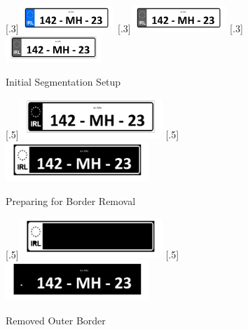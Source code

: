 \documentclass[a4paper]{article}
\begin{document}
	\begin{figure}[H]
		\centering
		[.3\linewidth]{\includegraphics[height=1cm]{Results/Q2/NumPlate5/qanumber_plate_5.jpg}}%
		[.3\linewidth]{\includegraphics[height=1cm]{Results/Q2/NumPlate5/qanumber_plate_5Grey.jpg}}%
		[.3\linewidth]{\includegraphics[height=1cm]{Results/Q2/NumPlate5/qanumber_plate_5Low.jpg}}%
		\caption{Initial Segmentation Setup}
		\label{fig:}
	\end{figure}
	\begin{figure}[H]
		\centering
		[.5\linewidth]{\includegraphics[height=1.5cm]{Results/Q2/NumPlate5/qanumber_plate_5Mid.jpg}}%
		[.5\linewidth]{\includegraphics[height=1.5cm]{Results/Q2/NumPlate5/qanumber_plate_5Not.jpg}}%
		\caption{Preparing for Border Removal}
		\label{fig:}
	\end{figure}
	\begin{figure}[H]
		\centering
		[.5\linewidth]{\includegraphics[height=1.5cm]{Results/Q2/NumPlate5/qanumber_plate_5Border.jpg}}%
		[.5\linewidth]{\includegraphics[height=1.5cm]{Results/Q2/NumPlate5/qanumber_plate_5NoBorder.jpg}}%
		\caption{Removed Outer Border}
		\label{fig:}
	\end{figure}
\end{document}
